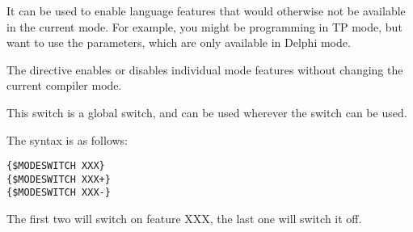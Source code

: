 It can be used to enable language features that would otherwise not be available 
in the current mode. For example, you might be programming in TP mode, but
want to use the  parameters, which are only available in Delphi mode. 

The  directive enables or disables individual mode features
without changing the current compiler mode.

This switch is a global switch, and can be used wherever the 
switch can be used.

The syntax is as follows:
\begin{verbatim}
{$MODESWITCH XXX}
{$MODESWITCH XXX+}
{$MODESWITCH XXX-}
\end{verbatim}
The first two will switch on feature XXX, the last one will switch it off.


